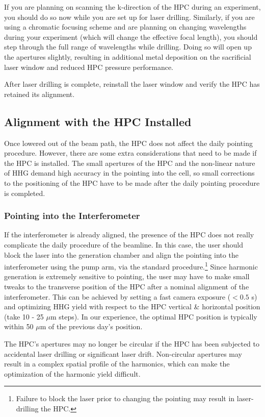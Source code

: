 If you are planning on scanning the k-direction of the HPC during an experiment, you should do so now while you are set up for laser drilling. Similarly, if you are using a chromatic focusing scheme and are planning on changing wavelengths during your experiment (which will change the effective focal length), you should step through the full range of wavelengths while drilling. Doing so will open up the apertures slightly, resulting in additional metal deposition on the sacrificial laser window and reduced HPC pressure performance.

After laser drilling is complete, reinstall the laser window and verify the HPC has retained its alignment.

\subsection{Alignment with the HPC Installed}

Once lowered out of the beam path, the HPC does not affect the daily pointing procedure. However, there are some extra considerations that need to be made if the HPC is installed. The small apertures of the HPC and the non-linear nature of HHG demand high accuracy in the pointing into the cell, so small corrections to the positioning of the HPC have to be made after the daily pointing procedure is completed.

\subsubsection{Pointing into the Interferometer}
If the interferometer is already aligned, the presence of the HPC does not really complicate the daily procedure of the beamline. In this case, the user should block the laser into the generation chamber and align the pointing into the interferometer using the pump arm, via the standard procedure.\footnote{Failure to block the laser prior to changing the pointing may result in laser-drilling the HPC.} Since harmonic generation is extremely sensitive to pointing, the user may have to make small tweaks to the transverse position of the HPC after a nominal alignment of the interferometer. This can be achieved by setting a fast camera exposure ($< 0.5$ s) and optimizing HHG yield with respect to the HPC vertical \& horizontal position (take 10 - 25 $\mu$m steps). In our experience, the optimal HPC position is typically within {50 $\mu$m} of the previous day's position.

The HPC's apertures may no longer be circular if the HPC has been subjected to accidental laser drilling or significant laser drift. Non-circular apertures may result in a complex spatial profile of the harmonics, which can make the optimization of the harmonic yield difficult.


